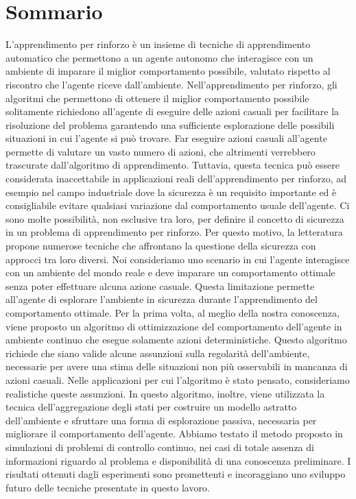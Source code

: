 \chapter*{Sommario}
\sloppy L'apprendimento per rinforzo è un insieme di tecniche di apprendimento automatico che permettono a un agente autonomo che interagisce con un ambiente di imparare il miglior comportamento possibile, valutato rispetto al riscontro che l'agente riceve dall'ambiente. Nell'apprendimento per rinforzo, gli algoritmi che permettono di ottenere il miglior comportamento possibile solitamente richiedono all'agente di eseguire delle azioni casuali per facilitare la risoluzione del problema garantendo una sufficiente esplorazione delle possibili situazioni in cui l'agente si può trovare. Far eseguire azioni casuali all'agente permette di valutare un vasto numero di azioni, che altrimenti verrebbero trascurate dall'algoritmo di apprendimento. Tuttavia, questa tecnica può essere considerata inaccettabile in applicazioni reali dell'apprendimento per rinforzo, ad esempio nel campo industriale dove la sicurezza è un requisito importante ed è consigliabile evitare qualsiasi variazione dal comportamento usuale dell'agente. Ci sono molte possibilità, non esclusive tra loro, per definire il concetto di sicurezza in un problema di apprendimento per rinforzo. Per questo motivo, la letteratura propone numerose tecniche che affrontano la questione della sicurezza con approcci tra loro diversi. Noi consideriamo uno scenario in cui l'agente interagisce con un ambiente del mondo reale e deve imparare un comportamento ottimale senza poter effettuare alcuna azione casuale. Questa limitazione permette all'agente di esplorare l'ambiente in sicurezza durante l'apprendimento del comportamento ottimale. Per la prima volta, al meglio della nostra conoscenza, viene proposto un algoritmo di ottimizzazione del comportamento dell'agente in ambiente continuo che esegue solamente azioni deterministiche. Questo algoritmo richiede che siano valide alcune assunzioni sulla regolarità dell'ambiente, necessarie per avere una stima delle situazioni non più osservabili in mancanza di azioni casuali. Nelle applicazioni per cui l'algoritmo è stato pensato, consideriamo realistiche queste assunzioni. In questo algoritmo, inoltre, viene utilizzata la tecnica dell'aggregazione degli stati per costruire un modello astratto dell'ambiente e sfruttare una forma di esplorazione passiva, necessaria per migliorare il comportamento dell'agente. Abbiamo testato il metodo proposto in simulazioni di problemi di controllo continuo, nei casi di totale assenza di informazioni riguardo al problema e disponibilità di una conoscenza preliminare. I risultati ottenuti dagli esperimenti sono promettenti e incoraggiano uno sviluppo futuro delle tecniche presentate in questo lavoro.

\endgroup